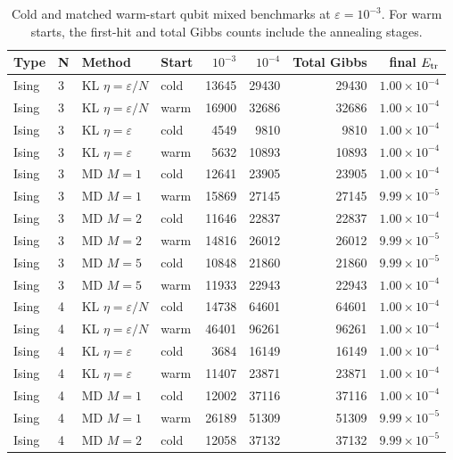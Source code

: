 \begin{table}[t]
\centering
\scriptsize
\caption{Cold and matched warm-start qubit mixed benchmarks at $\varepsilon=10^{-3}$. For warm starts, the first-hit and total Gibbs counts include the annealing stages.}
\label{tab:0608-warm-vs-cold-qubit-scaling}
\begin{tabular}{llllrrrr}
\toprule
Type & N & Method & Start & $10^{-3}$ & $10^{-4}$ & Total Gibbs & final $E_{\rm tr}$ \\
\midrule
Ising & 3 & KL $\eta=\varepsilon/N$ & cold & 13645 & 29430 & 29430 & $1.00\times 10^{-4}$ \\
Ising & 3 & KL $\eta=\varepsilon/N$ & warm & 16900 & 32686 & 32686 & $1.00\times 10^{-4}$ \\
Ising & 3 & KL $\eta=\varepsilon$ & cold & 4549 & 9810 & 9810 & $1.00\times 10^{-4}$ \\
Ising & 3 & KL $\eta=\varepsilon$ & warm & 5632 & 10893 & 10893 & $1.00\times 10^{-4}$ \\
Ising & 3 & MD $M=1$ & cold & 12641 & 23905 & 23905 & $1.00\times 10^{-4}$ \\
Ising & 3 & MD $M=1$ & warm & 15869 & 27145 & 27145 & $9.99\times 10^{-5}$ \\
Ising & 3 & MD $M=2$ & cold & 11646 & 22837 & 22837 & $1.00\times 10^{-4}$ \\
Ising & 3 & MD $M=2$ & warm & 14816 & 26012 & 26012 & $9.99\times 10^{-5}$ \\
Ising & 3 & MD $M=5$ & cold & 10848 & 21860 & 21860 & $9.99\times 10^{-5}$ \\
Ising & 3 & MD $M=5$ & warm & 11933 & 22943 & 22943 & $1.00\times 10^{-4}$ \\
\midrule
Ising & 4 & KL $\eta=\varepsilon/N$ & cold & 14738 & 64601 & 64601 & $1.00\times 10^{-4}$ \\
Ising & 4 & KL $\eta=\varepsilon/N$ & warm & 46401 & 96261 & 96261 & $1.00\times 10^{-4}$ \\
Ising & 4 & KL $\eta=\varepsilon$ & cold & 3684 & 16149 & 16149 & $1.00\times 10^{-4}$ \\
Ising & 4 & KL $\eta=\varepsilon$ & warm & 11407 & 23871 & 23871 & $1.00\times 10^{-4}$ \\
Ising & 4 & MD $M=1$ & cold & 12002 & 37116 & 37116 & $1.00\times 10^{-4}$ \\
Ising & 4 & MD $M=1$ & warm & 26189 & 51309 & 51309 & $9.99\times 10^{-5}$ \\
Ising & 4 & MD $M=2$ & cold & 12058 & 37132 & 37132 & $9.99\times 10^{-5}$ \\

\end{tabular}
\end{table}
